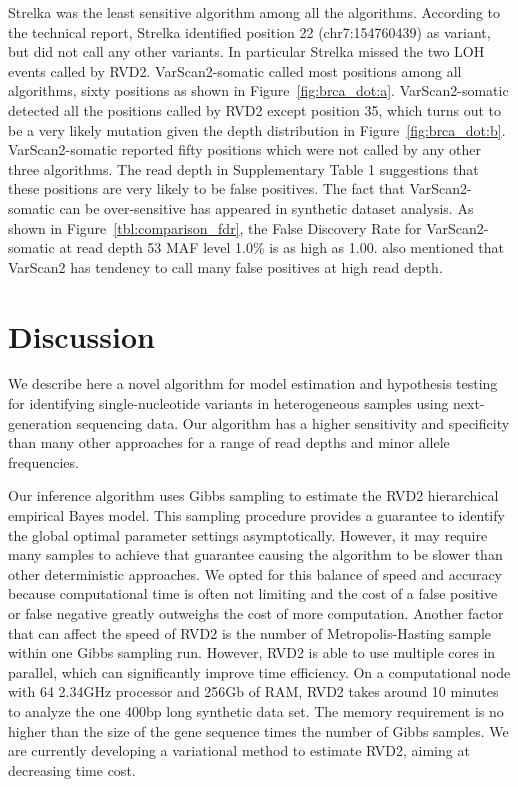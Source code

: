 \documentclass{bioinfo}
\begin{document}
Strelka was the least sensitive algorithm among all the algorithms. According to the technical report, Strelka identified position 22 (chr7:154760439) as variant, but did not call any other variants. In particular Strelka missed the two LOH events called by RVD2. VarScan2-somatic called most positions among all algorithms, sixty positions as shown in Figure~\ref{fig:brca_dot:a}. VarScan2-somatic  detected all the positions called by RVD2 except position 35, which turns out to be a very likely mutation given the depth distribution in Figure~\ref{fig:brca_dot:b}. VarScan2-somatic reported fifty positions which were not called by any other three algorithms. The read depth in Supplementary Table 1 suggestions that these positions are very likely to be false positives. The fact that VarScan2-somatic can be over-sensitive has appeared in synthetic dataset analysis. As shown in Figure~\ref{tbl:comparison_fdr}, the False Discovery Rate for VarScan2-somatic at read depth 53 MAF level 1.0\% is as high as 1.00.  \citet{spencer2013performance} also mentioned that VarScan2 has tendency to call many false positives at high read depth. 

\section{Discussion}
We describe here a novel algorithm for model estimation and hypothesis testing for identifying single-nucleotide variants in heterogeneous samples using next-generation sequencing data. Our algorithm has a higher sensitivity and specificity than many other approaches for a range of read depths and minor allele frequencies.

Our inference algorithm uses Gibbs sampling to estimate the RVD2 hierarchical empirical Bayes model. This sampling procedure provides a guarantee to identify the global optimal parameter settings asymptotically. However, it may require many samples to achieve that guarantee causing the algorithm to be slower than other deterministic approaches. We opted for this balance of speed and accuracy because computational time is often not limiting and the cost of a false positive or false negative greatly outweighs the cost of more computation. Another factor that can affect the speed of RVD2 is the number of Metropolis-Hasting sample within one Gibbs sampling run. However, RVD2 is able to use multiple cores in parallel, which can significantly improve time efficiency. On a computational node with 64 2.34GHz processor and 256Gb of RAM, RVD2 takes around 10 minutes to analyze the one 400bp long synthetic data set. The memory requirement is no higher than the size of the gene sequence times the number of Gibbs samples. We are currently developing a variational method to estimate RVD2, aiming at decreasing time cost. 
\end{document}
